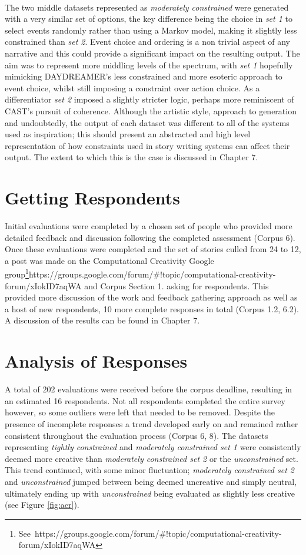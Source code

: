 \documentclass[letterpaper]{article}
\begin{document}
\\The two middle datasets represented as \emph{moderately constrained} were generated with a very similar set of options, the key difference being the choice in \emph{set 1} to select events randomly rather than using a Markov model, making it slightly less constrained than \emph{set 2}. Event choice and ordering is a non trivial aspect of any narrative and this could provide a significant impact on the resulting output. The aim was to represent more middling levels of the spectrum, with \emph{set 1} hopefully mimicking DAYDREAMER's less constrained and more esoteric approach to event choice, whilst still imposing a constraint over action choice. As a differentiator \emph{set 2} imposed a slightly stricter logic, perhaps more reminiscent of CAST's pursuit of coherence. Although the artistic style, approach to generation and undoubtedly, the output of each dataset was different to all of the systems used as inspiration; this should present an abstracted and high level representation of how constraints used in story writing systems can affect their output. The extent to which this is the case is discussed in Chapter 7.
\section{Getting Respondents}
Initial evaluations were completed by a chosen set of people who provided more detailed feedback and discussion following the completed assessment (Corpus 6). Once these evaluations were completed and the set of stories culled from 24 to 12, a post was made on the Computational Creativity Google group\footnote{See\ https://groups.google.com/forum/\#!topic/computational-creativity-forum/xIokID7aqWA}{https://groups.google.com/forum/\#!topic/computational-creativity-forum/xIokID7aqWA and Corpus Section 1.} asking for respondents. This provided more discussion of the work and feedback gathering approach as well as a host of new respondents, 10 more complete responses in total (Corpus 1.2, 6.2). A discussion of the results can be found in Chapter 7.

\section{Analysis of Responses}
A total of 202 evaluations were received before the corpus deadline, resulting in an estimated 16 respondents. Not all respondents completed the entire survey however, so some outliers were left that needed to be removed. 
Despite the presence of incomplete responses a trend developed early on and remained rather consistent throughout the evaluation process (Corpus 6, 8). The datasets representing \emph{tightly constrained} and \emph{moderately constrained set 1} were consistently deemed more creative than \emph{moderately constrained set 2} or the \emph{unconstrained} set. This trend continued, with some minor fluctuation; \emph{moderately constrained set 2} and \emph{unconstrained} jumped between being deemed uncreative and simply neutral,  ultimately ending up with \emph{unconstrained} being evaluated as slightly less creative (see Figure \ref{fig:acr}). 
\end{document}
